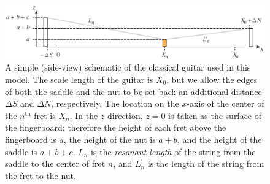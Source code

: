  \begin{figure}
  \centering
  \includegraphics[width=6.0in]{figures/guitar_schematic}
  \caption{\label{fig:guitar_schematic} A simple (side-view) schematic of the classical guitar used in this model. The scale length of the guitar is $X_0$, but we allow the edges of both the saddle and the nut to be set back an additional distance $\Delta S$ and $\Delta N$, respectively. The location on the $x$-axis of the center of the $n^\textrm{th}$ fret is $X_n$. In the $z$ direction, $z = 0$ is taken as the surface of the fingerboard; therefore the height of each fret above the fingerboard is $a$, the height of the nut is $a + b$, and the height of the saddle is $a + b + c$. $L_n$ is the \emph{resonant length} of the string from the saddle to the center of fret $n$, and $L^\prime_n$ is the length of the string from the fret to the nut.}
 \end{figure}


